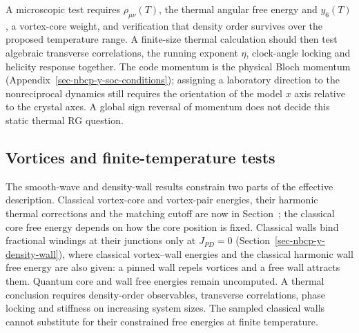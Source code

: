 A microscopic test requires \(\rho_{\mu\nu}(T)\), the thermal angular
free energy and \(y_6(T)\), a vortex-core weight, and verification that
density order survives over the proposed temperature range. A
finite-size thermal calculation should then test algebraic transverse
correlations, the running exponent \(\eta\), clock-angle locking and
helicity response together. The code momentum is the physical Bloch
momentum (Appendix~\ref{sec-nbcp-y-soc-conditions}); assigning a
laboratory direction to the nonreciprocal dynamics still requires the
orientation of the model \(x\) axis relative to the crystal axes. A
global sign reversal of momentum does not decide this static thermal RG
question.

\enlargethispage{\baselineskip}
\subsection{Vortices and finite-temperature
tests}\label{vortices-and-finite-temperature-tests}

The smooth-wave and density-wall results constrain two parts of the
effective description. Classical vortex-core and vortex-pair energies,
their harmonic thermal corrections and the matching cutoff are now in
Section~; the classical core free energy
depends on how the core position is fixed. Classical walls bind fractional
windings at their junctions only at \(J_{PD}=0\)
(Section~\ref{sec-nbcp-y-density-wall}), where classical vortex--wall
energies and the classical harmonic wall free energy are also given: a
pinned wall repels vortices and a free wall attracts them. Quantum core
and wall free energies remain uncomputed. A thermal conclusion
requires density-order observables, transverse correlations, phase
locking and stiffness on increasing system sizes. The sampled classical
walls cannot substitute for their constrained free energies at finite
temperature.
